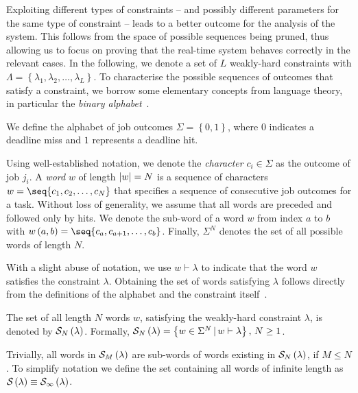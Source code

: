 Exploiting different types of constraints -- and possibly different parameters for the same type of constraint -- leads to a better outcome for the analysis of the system. 
This follows from the space of possible sequences being pruned, thus allowing us to focus on proving that the real-time system behaves correctly in the relevant cases. 
In the following, we denote a set of $L$ weakly-hard constraints with $\Lambda = \left\{ \lambda_1, \lambda_2, \ldots, \lambda_L \right\} $. 
To characterise the possible sequences of outcomes that satisfy a constraint, we borrow some elementary concepts from language theory, in particular the \emph{binary alphabet}~\cite{Hopcroft:2006}.
%
\begin{definition}%
\label{def:alphabet}%
    We define the alphabet of job outcomes $\Sigma = \left\{ 0, 1 \right\}$, where $0$ indicates a deadline miss and $1$ represents a deadline hit.
\end{definition}
%
Using well-established notation, we denote the \emph{character} $c_i \in \Sigma$ as the outcome of job $j_i$.
A \emph{word} $w$ of length $\left|w\right| = N$ is a sequence of characters $w = \seq{ c_1, c_2, \ldots, c_N }$ that specifies a sequence of consecutive job outcomes for a task.
Without loss of generality, we assume that all words are preceded and followed only by hits.
We denote the sub-word of a word $w$ from index $a$ to $b$ with $w\funof{a, b} = \seq{ c_a, c_{a+1}, \ldots, c_b }$.
Finally, $\Sigma^N$ denotes the set of all possible words of length $N$.

With a slight abuse of notation, we use $w \vdash \lambda$ to indicate that the word $w$ satisfies the constraint $\lambda$.
Obtaining the set of words satisfying $\lambda$ follows directly from the definitions of the alphabet and the constraint itself~\cite{Bernat:2001, Bernat:1998}.
%
\begin{definition}%
    \label{def:satisfaction-set}%
    The set of all length $N$ words $w$, satisfying the weakly-hard constraint $\lambda$, is denoted by $\mathcal{S}_{N}\left( \lambda \right)$.
    Formally, $\mathcal{S}_{N}\left( \lambda \right) = \left\{ w \in \Sigma^N \, | \, w \vdash \lambda \right\},\, N \geq 1$.
\end{definition}
%
Trivially, all words in $\mathcal{S}_{M}\left( \lambda \right)$ are sub-words of words existing in $\mathcal{S}_{N}\left( \lambda \right)$, if $M \leq N$.
To simplify notation we define the set containing all words of infinite length as $\mathcal{S}_{}\left( \lambda \right) \equiv \mathcal{S}_{\infty}\left( \lambda \right)$.

